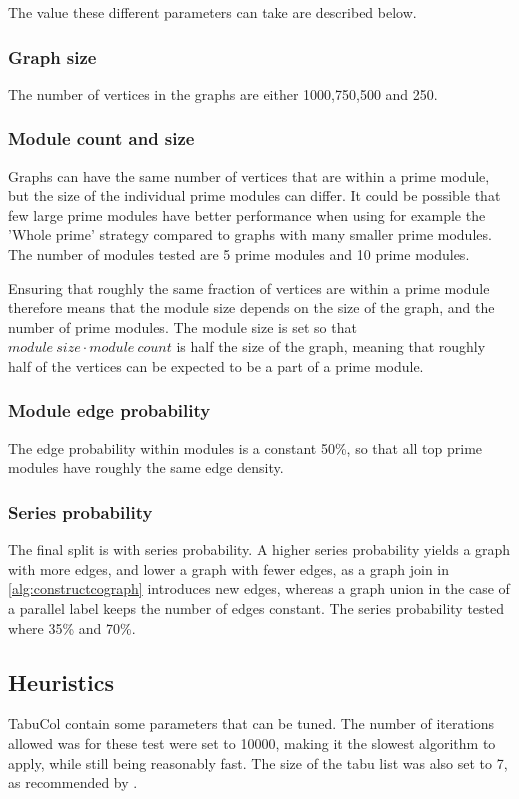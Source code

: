 \documentclass[a4paper]{article}
\begin{document}
The value these different parameters can take are described below.
\subsubsection{Graph size}

The number of vertices in the graphs are either 1000,750,500 and 250.

\subsubsection{Module count and size}

Graphs can have the same number of vertices that are within a prime module,
but the size of the individual prime modules can differ. It could be possible that
few large prime modules have better performance when using for example the
'Whole prime' strategy compared to graphs with many smaller prime modules.
The number of modules tested are 5 prime modules and 10 prime modules.

Ensuring that roughly the same fraction of vertices are within a prime module
therefore means that the module size depends on the size of the graph, and the
number of prime modules. The module size is set so that $module\ size \cdot
module\ count$ is half the size of the graph, meaning that roughly half of the
vertices can be expected to be a part of a prime module.

\subsubsection{Module edge probability}
The edge probability within modules is a  constant 50\%, so that all top
prime modules have roughly the same edge density. 

\subsubsection{Series probability}
The final split is with series probability. A higher series probability yields a graph
with more edges, and lower a graph with fewer  edges, as a graph join in
\autoref{alg:constructcograph} introduces new edges, whereas a graph union in the
case of a parallel label keeps the number of edges constant. The series probability
tested where 35\% and 70\%.

\subsection{Heuristics}
TabuCol contain some parameters that can be tuned. The number of
iterations allowed was for these test were set to 10000, making it the slowest
algorithm to apply, while still being reasonably fast. The size of the tabu list 
was also set to 7, as recommended by \cite{1990}.
\end{document}
